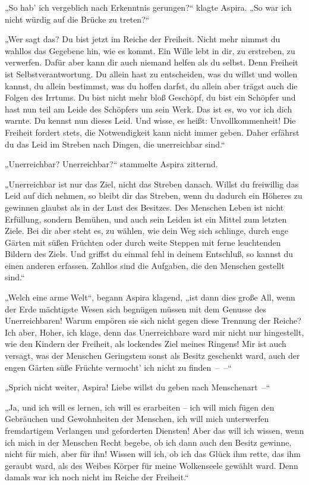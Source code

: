 „So hab' ich vergeblich nach Erkenntnis gerungen?“ klagte Aspira.
„So war ich nicht würdig auf die Brücke zu treten?“

„Wer sagt das? Du bist jetzt im Reiche der Freiheit. Nicht mehr
nimmst du wahllos das Gegebene hin, wie es kommt. Ein Wille lebt in
dir, zu erstreben, zu verwerfen. Dafür aber kann dir auch niemand
helfen als du selbst. Denn Freiheit ist Selbstverantwortung. Du
allein hast zu entscheiden, was du willst und wollen kannst, du
allein bestimmst, was du hoffen darfst, du allein aber trägst auch
die Folgen des Irrtums. Du bist nicht mehr bloß Geschöpf, du bist
ein Schöpfer und hast nun teil am Leide des Schöpfers um sein Werk.
Das ist es, wo vor ich dich warnte. Du kennst nun dieses Leid. Und
wisse, es heißt: Unvollkommenheit! Die Freiheit fordert stets, die
Notwendigkeit kann nicht immer geben. Daher erfährst du das Leid im
Streben nach Dingen, die unerreichbar sind.“

„Unerreichbar? Unerreichbar?“ stammelte Aspira zitternd.

„Unerreichbar ist nur das Ziel, nicht das Streben danach. Willst du
freiwillig das Leid auf dich nehmen, so bleibt dir das Streben,
wenn du dadurch ein Höheres zu gewinnen glaubst als in der Lust des
Besitzes. Des Menschen Leben ist nicht Erfüllung, sondern Bemühen,
und auch sein Leiden ist ein Mittel zum letzten Ziele. Bei dir aber
steht es, zu wählen, wie dein Weg sich schlinge, durch enge Gärten
mit süßen Früchten oder durch weite Steppen mit ferne leuchtenden
Bildern des Ziels. Und griffst du einmal fehl in deinem Entschluß,
so kannst du einen anderen erfassen. Zahllos sind die Aufgaben, die
den Menschen gestellt sind.“

„Welch eine arme Welt“, begann Aspira klagend, „ist dann dies große
All, wenn der Erde mächtigste Wesen sich begnügen müssen mit dem
Genusse des Unerreichbaren! Warum empören sie sich nicht gegen
diese Trennung der Reiche? Ich aber, Hoher, ich klage, denn das
Unerreichbare ward mir nicht nur hingestellt, wie den Kindern der
Freiheit, als lockendes Ziel meines Ringens! Mir ist auch versagt,
was der Menschen Geringstem sonst als Besitz geschenkt ward, auch
der engen Gärten süße Früchte vermocht' ich nicht zu finden~–~–“

„Sprich nicht weiter, Aspira! Liebe willst du geben nach
Menschenart~–“

„Ja, und ich will es lernen, ich will es erarbeiten – ich will mich
fügen den Gebräuchen und Gewohnheiten der Menschen, ich will mich
unterwerfen fremdartigem Verlangen und geforderten Diensten! Aber
das will ich wissen, wenn ich mich in der Menschen Recht begebe, ob
ich dann auch den Besitz gewinne, nicht für mich, aber für ihn!
Wissen will ich, ob ich das Glück ihm rette, das ihm geraubt ward,
als des Weibes Körper für meine Wolkenseele gewählt ward. Denn
damals war ich noch nicht im Reiche der Freiheit.“

